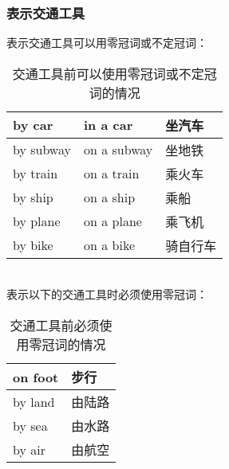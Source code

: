 \documentclass[UTF8]{ctexart}
\begin{document}
\subsubsection{表示交通工具}
    表示交通工具可以用零冠词或不定冠词：\vspace{5pt}
    \begin{table}[h!]
        \begin{center}
            \ttfamily
            \begin{tabular}{p{80pt}|p{80pt}|p{60pt}}
                \hline
                by car&in a car&坐汽车\\ \hline
                by subway&on a subway&坐地铁\\ \hline
                by train&on a train&乘火车\\ \hline
                by ship&on a ship&乘船\\ \hline
                by plane&on a plane&乘飞机\\ \hline
                by bike&on a bike&骑自行车\\ \hline
            \end{tabular}
            \rmfamily
            \caption{交通工具前可以使用零冠词或不定冠词的情况}
        \end{center}
    \end{table}\\
    表示以下的交通工具时必须使用零冠词：\vspace{5pt}
    \begin{table}[h!]
        \begin{center}
            \ttfamily
            \begin{tabular}{p{100pt}|p{60pt}}
                \hline
                on foot&步行\\ \hline
                by land&由陆路\\ \hline
                by sea&由水路\\ \hline
                by air&由航空\\ \hline
            \end{tabular}
            \rmfamily
            \caption{交通工具前必须使用零冠词的情况}
        \end{center}
    \end{table}\vspace{-20pt}
\end{document}
